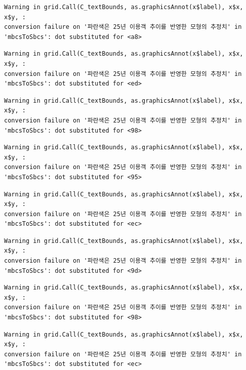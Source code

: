 \documentclass[
  letterpaper,
  DIV=11,
  numbers=noendperiod]{scrreprt}
\begin{document}
\begin{verbatim}
Warning in grid.Call(C_textBounds, as.graphicsAnnot(x$label), x$x, x$y, :
conversion failure on '파란색은 25년 이용객 추이를 반영한 모형의 추정치' in
'mbcsToSbcs': dot substituted for <a8>
\end{verbatim}

\begin{verbatim}
Warning in grid.Call(C_textBounds, as.graphicsAnnot(x$label), x$x, x$y, :
conversion failure on '파란색은 25년 이용객 추이를 반영한 모형의 추정치' in
'mbcsToSbcs': dot substituted for <ed>
\end{verbatim}

\begin{verbatim}
Warning in grid.Call(C_textBounds, as.graphicsAnnot(x$label), x$x, x$y, :
conversion failure on '파란색은 25년 이용객 추이를 반영한 모형의 추정치' in
'mbcsToSbcs': dot substituted for <98>
\end{verbatim}

\begin{verbatim}
Warning in grid.Call(C_textBounds, as.graphicsAnnot(x$label), x$x, x$y, :
conversion failure on '파란색은 25년 이용객 추이를 반영한 모형의 추정치' in
'mbcsToSbcs': dot substituted for <95>
\end{verbatim}

\begin{verbatim}
Warning in grid.Call(C_textBounds, as.graphicsAnnot(x$label), x$x, x$y, :
conversion failure on '파란색은 25년 이용객 추이를 반영한 모형의 추정치' in
'mbcsToSbcs': dot substituted for <ec>
\end{verbatim}

\begin{verbatim}
Warning in grid.Call(C_textBounds, as.graphicsAnnot(x$label), x$x, x$y, :
conversion failure on '파란색은 25년 이용객 추이를 반영한 모형의 추정치' in
'mbcsToSbcs': dot substituted for <9d>
\end{verbatim}

\begin{verbatim}
Warning in grid.Call(C_textBounds, as.graphicsAnnot(x$label), x$x, x$y, :
conversion failure on '파란색은 25년 이용객 추이를 반영한 모형의 추정치' in
'mbcsToSbcs': dot substituted for <98>
\end{verbatim}

\begin{verbatim}
Warning in grid.Call(C_textBounds, as.graphicsAnnot(x$label), x$x, x$y, :
conversion failure on '파란색은 25년 이용객 추이를 반영한 모형의 추정치' in
'mbcsToSbcs': dot substituted for <ec>
\end{verbatim}
\end{document}
